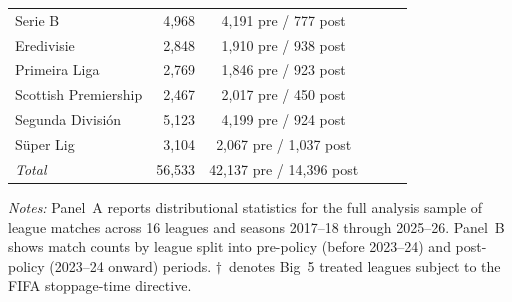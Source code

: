 \begin{table}[htbp]
\begin{threeparttable}
\begin{tabular}{lrrrrrr}
\quad Serie B & 4,968 & \multicolumn{2}{c}{4,191 pre / 777 post} & & & \\
\quad Eredivisie & 2,848 & \multicolumn{2}{c}{1,910 pre / 938 post} & & & \\
\quad Primeira Liga & 2,769 & \multicolumn{2}{c}{1,846 pre / 923 post} & & & \\
\quad Scottish Premiership & 2,467 & \multicolumn{2}{c}{2,017 pre / 450 post} & & & \\
\quad Segunda División & 5,123 & \multicolumn{2}{c}{4,199 pre / 924 post} & & & \\
\quad Süper Lig & 3,104 & \multicolumn{2}{c}{2,067 pre / 1,037 post} & & & \\
\quad \textit{Total} & 56,533 & \multicolumn{2}{c}{42,137 pre / 14,396 post} & & & \\
\bottomrule
\end{tabular}
\begin{tablenotes}[flushleft]
\footnotesize
\item \textit{Notes:} Panel~A reports distributional statistics for the full analysis
sample of league matches across 16 leagues and seasons 2017--18 through 2025--26.
Panel~B shows match counts by league split into pre-policy (before 2023--24) and
post-policy (2023--24 onward) periods. $\dagger$~denotes Big~5 treated leagues
subject to the FIFA stoppage-time directive.
\end{tablenotes}
\end{threeparttable}
\end{table}
